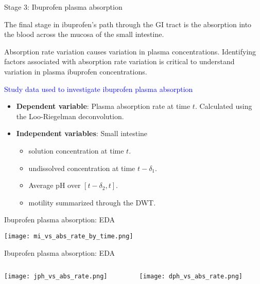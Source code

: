 \documentclass[]{beamer}
\begin{document}
\begin{frame}{Stage 3: Ibuprofen plasma absorption}

\small

The final stage in ibuprofen's path through the GI tract is the absorption into the blood across the mucosa of the small intestine.

\smallskip

Absorption rate variation causes variation in plasma concentrations. Identifying factors associated with absorption rate variation is critical to understand variation in plasma ibuprofen concentrations.

\bigskip


\textcolor{blue}{Study data used to investigate ibuprofen plasma absorption}
\begin{itemize}
	\item {\bf Dependent variable}: Plasma absorption rate at time $t$. Calculated using the Loo-Riegelman deconvolution.
	\item {\bf Independent variables}: Small intestine
	\begin{itemize}
		\item solution concentration at time $t$.
		\item undissolved concentration at time $t - \delta_1$.
		\item Average pH over $[t - \delta_2, t]$.
		\item motility summarized through the DWT.
	\end{itemize}
\end{itemize}

\end{frame}

\begin{frame}{Ibuprofen plasma absorption: EDA}

\texttt{[image: mi\_vs\_abs\_rate\_by\_time.png]}

\end{frame}

\begin{frame}{Ibuprofen plasma absorption: EDA}

\begin{columns}
\begin{column}{.5\textwidth}
\texttt{[image: jph\_vs\_abs\_rate.png]}
\end{column}
\begin{column}{.5\textwidth}
\texttt{[image: dph\_vs\_abs\_rate.png]}
\end{column}
\end{columns}



\end{frame}
\end{document}
